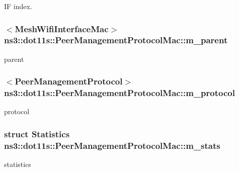 IF index. 

\subsubsection[{\texorpdfstring{m\+\_\+parent}{m_parent}}]{$<${\bf Mesh\+Wifi\+Interface\+Mac}$>$ ns3\+::dot11s\+::\+Peer\+Management\+Protocol\+Mac\+::m\+\_\+parent\hspace{0.3cm}{\ttfamily [private]}}\hypertarget{classns3_1_1dot11s_1_1PeerManagementProtocolMac_a14edf9af29af164f967ccc6e77d8ea03}{}\label{classns3_1_1dot11s_1_1PeerManagementProtocolMac_a14edf9af29af164f967ccc6e77d8ea03}


parent 

\subsubsection[{\texorpdfstring{m\+\_\+protocol}{m_protocol}}]{$<${\bf Peer\+Management\+Protocol}$>$ ns3\+::dot11s\+::\+Peer\+Management\+Protocol\+Mac\+::m\+\_\+protocol\hspace{0.3cm}{\ttfamily [private]}}\hypertarget{classns3_1_1dot11s_1_1PeerManagementProtocolMac_afbdd1f31cd54c320267ffb3426559095}{}\label{classns3_1_1dot11s_1_1PeerManagementProtocolMac_afbdd1f31cd54c320267ffb3426559095}


protocol 

\subsubsection[{\texorpdfstring{m\+\_\+stats}{m_stats}}]{\setlength{\rightskip}{0pt plus 5cm}struct {\bf Statistics} ns3\+::dot11s\+::\+Peer\+Management\+Protocol\+Mac\+::m\+\_\+stats\hspace{0.3cm}{\ttfamily [private]}}\hypertarget{classns3_1_1dot11s_1_1PeerManagementProtocolMac_aaaccd87941623a8bff20e8998908b518}{}\label{classns3_1_1dot11s_1_1PeerManagementProtocolMac_aaaccd87941623a8bff20e8998908b518}
statistics 

